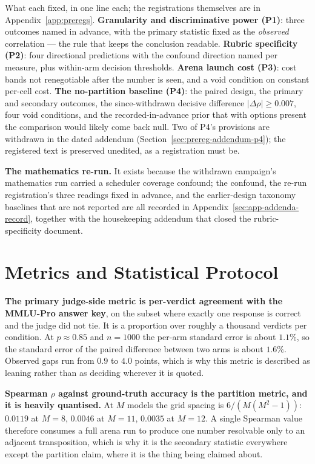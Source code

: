 What each fixed, in one line each; the registrations themselves are
in Appendix~\ref{app:preregs}.
\textbf{Granularity and discriminative power (P1)}: three outcomes
named in advance, with the primary statistic fixed as the
\emph{observed} correlation --- the rule that keeps the conclusion
readable. \textbf{Rubric specificity (P2)}: four directional
predictions with the confound direction named per measure, plus
within-arm decision thresholds. \textbf{Arena launch cost (P3)}: cost
bands not renegotiable after the number is seen, and a void condition
on constant per-cell cost. \textbf{The no-partition baseline (P4)}:
the paired design, the primary and secondary outcomes, the
since-withdrawn decisive difference $|\Delta\rho| \geq 0.007$, four
void conditions, and the recorded-in-advance prior that with options
present the comparison would likely come back null. Two of P4's
provisions are withdrawn in the dated addendum
(Section~\ref{sec:prereg-addendum-p4}); the registered text is
preserved unedited, as a registration must be.

\textbf{The mathematics re-run.} It exists because the withdrawn
campaign's mathematics run carried a scheduler coverage confound; the
confound, the re-run registration's three readings fixed in advance,
and the earlier-design taxonomy baselines that are not reported are
all recorded in Appendix~\ref{sec:app-addenda-record}, together with
the housekeeping addendum that closed the rubric-specificity
document.

\section{Metrics and Statistical Protocol}\label{sec:exp-metrics}

\textbf{The primary judge-side metric is per-verdict agreement with the
MMLU-Pro answer key}, on the subset where exactly one response is
correct and the judge did not tie. It is a proportion over roughly a
thousand verdicts per condition. At $p \approx 0.85$ and $n = 1000$ the
per-arm standard error is about $1.1\%$, so the standard error of the
paired difference between two arms is about $1.6\%$. Observed gaps run
from $0.9$ to $4.0$ points, which is why this metric is described as
leaning rather than as deciding wherever it is quoted.

\textbf{Spearman $\rho$ against ground-truth accuracy is the partition
metric, and it is heavily quantised.} At $M$ models the grid spacing is
$6/(M(M^2-1))$: $0.0119$ at $M = 8$, $0.0046$ at $M = 11$, $0.0035$ at
$M = 12$. A single Spearman value therefore consumes a full arena run to
produce one number resolvable only to an adjacent transposition, which
is why it is the secondary statistic everywhere except the partition
claim, where it is the thing being claimed about.

